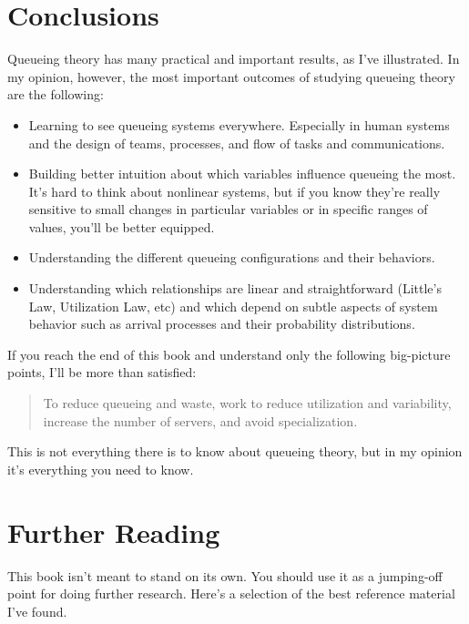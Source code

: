 \documentclass{vivid_layout}
\begin{document}
\section{Conclusions}
Queueing theory has many practical and important results, as I've
illustrated. In my opinion, however, the most important outcomes of
studying queueing theory are the following:
\begin{itemize}
\item Learning to see queueing systems everywhere. Especially in human systems and the design of teams, processes, and flow of tasks and communications.
\item Building better intuition about which variables influence queueing the most. It's hard to think about nonlinear systems, but if you know they're really sensitive to small changes in particular variables or in specific ranges of values, you'll be better equipped.
\item Understanding the different queueing configurations and their behaviors.
\item Understanding which relationships are linear and straightforward (Little's Law, Utilization Law, etc) and which depend on subtle aspects of system behavior such as arrival processes and their probability distributions.
\end{itemize}
If you reach the end of this book and understand only the following big-picture points, I'll be more than satisfied:
\begin{quote}	%
To reduce queueing and waste, work to reduce utilization and variability, increase the number of servers, and avoid specialization.
\end{quote}
This is not everything there is to know about queueing theory, but in my opinion it's everything you need to know.

\section{Further Reading}

This book isn't meant to stand on its own. You should use it as a jumping-off
point for doing further research. Here's a selection of the best reference
material I've found.
\end{document}
